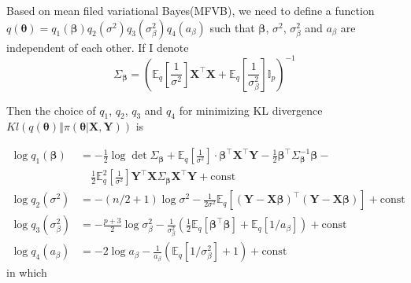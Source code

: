 \documentclass[12pt]{article}
\begin{document}
Based on mean filed variational Bayes(MFVB), we need to define a function $q(\bm{\theta}) = q_1(\bm{\beta})q_2(\sigma^2)q_3(\sigma_{\beta}^2)q_4(a_\beta)$ such that $\bm{\beta}$, $\sigma^2$, $\sigma_{\beta}^2$ and $a_\beta$ are independent of each other. If I denote 
\[ \Sigma_{\bm{\beta}} = \left( \mathbb{E}_q\left[\frac{1}{\sigma^2} \right]\bm{X}^\top \bm{X} + \mathbb{E}_q\left[\frac{1}{\sigma_{\beta}^2} \right]\mathbb{I}_p \right)^{-1}\]

 Then the choice of $q_1$, $q_2$, $q_3$ and $q_4$ for minimizing KL divergence $Kl\left(\left. q(\bm{\theta}) \right\Vert \pi(\left.\bm{\theta}\right\vert \bm{X}, \bm{Y})\right)$ is

\begin{align*}
	\log q_1(\bm{\beta}) &= -\frac{1}{2} \log \det \Sigma_{\bm{\beta}} + \mathbb{E}_q\left[\frac{1}{\sigma^2} \right]\cdot \bm{\beta}^\top \bm{X}^\top \bm{Y} - \frac{1}{2}\bm{\beta}^\top \Sigma_{\bm{\beta}}^{-1} \bm{\beta} -  \\
	& \quad \frac{1}{2} \mathbb{E}_q^{2}\left[\frac{1}{\sigma^2} \right] \bm{Y}^\top \bm{X} \Sigma_{\bm{\beta}} \bm{X}^\top \bm{Y} + \text{const}\\
	\log q_2(\sigma^2) &= -(n/2+1)\log \sigma^2 - \frac{1}{2\sigma^2} \mathbb{E}_{q}\left[ (\bm{Y} - \bm{X}\bm{\beta})^\top (\bm{Y} - \bm{X}\bm{\beta}) \right] + \text{const} \\
	\log q_3(\sigma_{\beta}^2) &= -\frac{p+3}{2}\log \sigma_{\beta}^2 - \frac{1}{\sigma_{\beta}^2}\left( \frac{1}{2}\mathbb{E}_{q}[\bm{\beta}^\top \bm{\beta}] + \mathbb{E}_q[1/a_\beta] \right) + \text{const} \\
	\log q_4(a_\beta) &= -2\log a_\beta - \frac{1}{a_\beta} \left( \mathbb{E}_{q}[1/\sigma_{\beta}^2]+1 \right) + \text{const}
\end{align*}
in which
\end{document}
